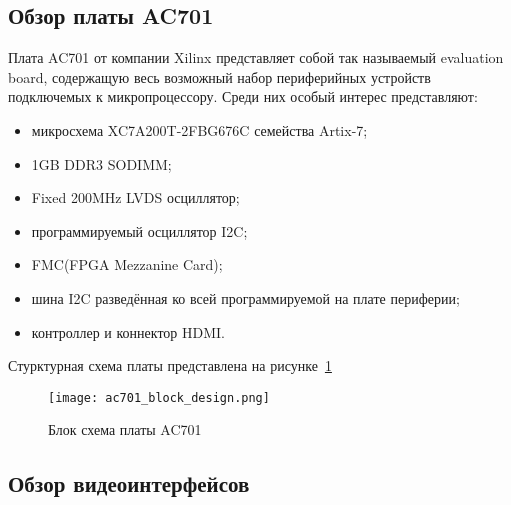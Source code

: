 


\subsection{Обзор платы AC701}
\label{sub:domain:ac701}

Плата AC701 от компании Xilinx представляет собой так называемый evaluation board,
содержащую весь возможный набор периферийных устройств подключемых к микропроцессору.
Среди них особый интерес представляют:
\begin{itemize}
  \item микросхема XC7A200T-2FBG676C семейства Artix-7;
  \item 1GB DDR3 SODIMM;
  \item Fixed 200MHz LVDS осциллятор;
  \item программируемый осциллятор I2C;
  \item FMC(FPGA Mezzanine Card);
  \item шина I2C разведённая ко всей программируемой на плате периферии;
  \item контроллер и коннектор HDMI.
\end{itemize}

Стурктурная схема платы представлена на рисунке~\ref{fig:domain:ac701:block_design}

\begin{figure}[ht]
  \centering
  \texttt{[image: ac701\_block\_design.png]}
  \caption{ Блок схема платы AC701 }
  \label{fig:domain:ac701:block_design}
\end{figure}


\subsection{Обзор видеоинтерфейсов}
\label{sub:domain:videointerfaces}



